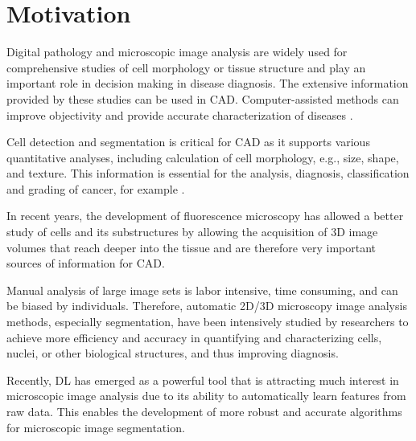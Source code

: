 \cleardoublepage
\label{chap:intro}
\section{Motivation}
\label{section:motivation}

Digital pathology and microscopic image analysis are widely used for comprehensive studies of cell morphology or tissue structure and play an important role in decision making in disease diagnosis. The extensive information provided by these studies can be used in \ac{CAD}. Computer-assisted methods can improve objectivity and provide accurate characterization of diseases \cite{review:1}. 

Cell detection and segmentation is critical for \ac{CAD} as it supports various quantitative analyses, including calculation of cell morphology, e.g., size, shape, and texture. This information is essential for the analysis, diagnosis, classification and grading of cancer, for example \cite{review:2}.

In recent years, the development of fluorescence microscopy has allowed a better study of cells and its substructures by allowing the acquisition of \ac{3D} image volumes that reach deeper into the tissue \cite{fluorescence} and are therefore very important sources of information for \ac{CAD}.

Manual analysis of large image sets is labor intensive, time consuming, and can be biased by individuals. Therefore, automatic \ac{2D}/\ac{3D} microscopy image analysis methods, especially segmentation, have been intensively studied by researchers \cite{review:2021deep} to achieve more efficiency and accuracy in quantifying and characterizing cells, nuclei, or other biological structures, and thus improving diagnosis.

Recently, \ac{DL} has emerged as a powerful tool that is attracting much interest in microscopic image analysis \cite{review:3} due to its ability to automatically learn features from raw data. This enables the development of more robust and accurate algorithms for microscopic image segmentation. 

